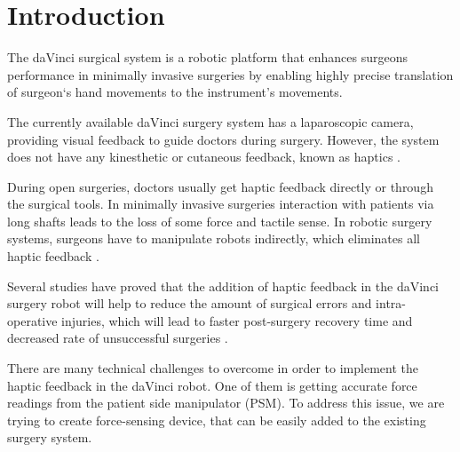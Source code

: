 \chapter{Introduction}
\label{intro} %


The daVinci surgical system is a robotic platform that enhances surgeons performance in minimally invasive surgeries by enabling highly precise translation of surgeon`s hand movements to the instrument's movements. 

The currently available daVinci surgery system 
has a laparoscopic camera, providing visual feedback to guide doctors during surgery. However, the system does not have any kinesthetic or cutaneous feedback, known as haptics \cite{_intuitive_2018}.


During open surgeries, doctors usually get haptic feedback directly or through the surgical tools. In minimally invasive surgeries interaction with patients via long shafts leads to the loss of some force and tactile sense. In robotic surgery systems, surgeons have to manipulate robots indirectly, which eliminates all haptic feedback \cite{okamura_haptic_2009}.

Several studies \cite{wagner_benefit_2007, yiasemidou_faster_2011, currie_role_2017} have proved that the addition of haptic feedback in the daVinci surgery robot will help to reduce the amount of surgical errors and intra-operative injuries, which will lead to faster post-surgery recovery time and decreased rate of unsuccessful surgeries \cite{reiley_effects_2008, van_der_meijden_value_2009, okamura_haptic_2009}.

There are many technical challenges to overcome in order to implement the haptic feedback in the daVinci robot. One of them is getting accurate force readings from the patient side manipulator (PSM). To address this issue, we are trying to create force-sensing device, that can be easily added to the existing surgery system.
